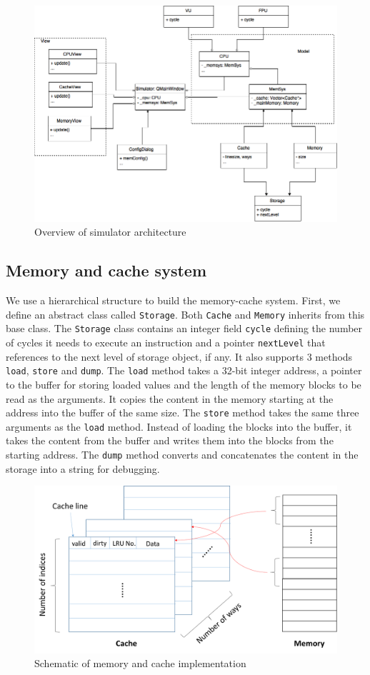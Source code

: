 \documentclass{sig-alternate}
\begin{document}
\begin{figure}
\centering
\includegraphics[width = 0.8\linewidth,keepaspectratio]{uml_simulator}
\caption{Overview of simulator architecture}
\label{fig:uml}
\end{figure}

\subsection{Memory and cache system}
We use a hierarchical structure to build the memory-cache system. First, we define an abstract class called \texttt{Storage}. Both \texttt{Cache} and \texttt{Memory} inherits from this base class. The \texttt{Storage} class contains an integer field \texttt{cycle} defining the number of cycles it needs to execute an instruction and a pointer \texttt{nextLevel} that references to the next level of storage object, if any. It also supports 3 methods \texttt{load}, \texttt{store} and \texttt{dump}. The \texttt{load} method takes a 32-bit integer address, a pointer to the buffer for storing loaded values and the length of the memory blocks to be read as the arguments. It copies the content in the memory starting at the address into the buffer of the same size. The \texttt{store} method takes the same three arguments as the \texttt{load} method. Instead of loading the blocks into the buffer, it takes the content from the buffer and writes them into the blocks from the starting address. The \texttt{dump} method converts and concatenates the content in the storage into a string for debugging.  

\begin{figure}
\centering
\includegraphics[width = 0.8\linewidth,keepaspectratio]{Cache_and_Memory.png}
\caption{Schematic of memory and cache implementation}
\label{fig:cache_vs_memory}
\end{figure}
\end{document}
